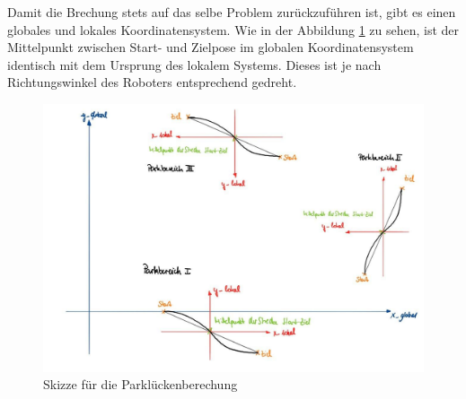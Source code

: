 \noindent Damit die Brechung stets auf das selbe Problem zurückzuführen ist, gibt es einen globales und lokales Koordinatensystem. Wie in der Abbildung \ref{img:grafik-Parkluecke} zu sehen, ist der Mittelpunkt zwischen Start- und Zielpose im globalen Koordinatensystem identisch mit dem Ursprung des lokalem Systems. Dieses ist je nach Richtungswinkel des Roboters entsprechend gedreht. \\
   
\begin{figure}[h]
	\centering
	\includegraphics[width=1\textwidth]{SkizzeParklueckenberechung}
	\caption{Skizze für die Parklückenberechung}
	\label{img:grafik-Parkluecke}
\end{figure}